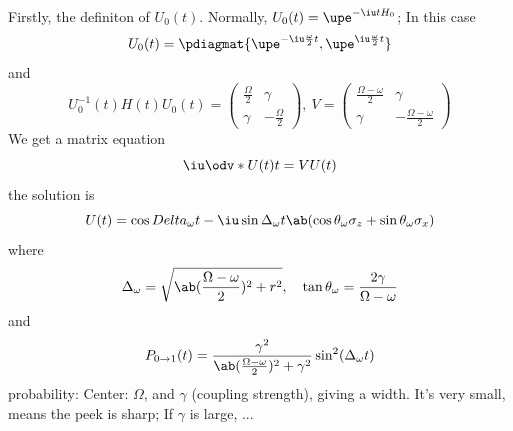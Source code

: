 \begin{enumext}[wrap-label = \underline{Case #1}, label = \arabic*,
                list-indent = 0pt]
  Firstly, the definiton of $U_0(t)$.
  Normally, $U_0(t) = \upe^{-\iu tH_0}$; In this case
  \[
    U_0(t) = \pdiagmat{\upe^{-\iu\frac\omega2t}, \upe^{\iu\frac\omega2t}}
  \]
  and
  \[
    U_0^{-1}(t) H(t) U_0(t)
  = \begin{pmatrix}
      \frac\Omega2 & \gamma \\ \gamma & -\frac\Omega2
    \end{pmatrix},~
    V =
    \begin{pmatrix}
      \frac{\Omega - \omega}2 & \gamma\\
      \gamma & -\frac{\Omega - \omega}2
    \end{pmatrix}
  \]
  We get a matrix equation
  \[
    \iu \odv*{U(t)}t = V U(t)
  \]
  the solution is
  \[
    U(t) = \cos Delta_\omega t - \iu \sin\Delta_\omega t
    \ab(\cos\theta_\omega \sigma_z + \sin \theta_\omega \sigma_x)
  \]
  where
  \[
    \Delta_\omega = \sqrt{\ab(\frac{\Omega - \omega}{2})^2 + r^2}, \quad
    \tan \theta_\omega = \frac{2\gamma}{\Omega - \omega}
  \]
  and
  \[
    P_{0\to1}(t) = \frac{\gamma^2}{\ab(\frac{\Omega - \omega}{2})^2 + \gamma^2} \sin^2(\Delta_\omega t)
  \]
  probability: Center: $\Omega$, and $\gamma$ (coupling strength), giving a width. It's very small, means the peek is sharp;
  If $\gamma$ is large, ...
\end{enumext}